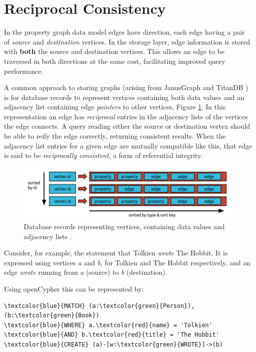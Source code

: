\documentclass[sigplan,10pt]{acmart}
\begin{document}
\section{Reciprocal Consistency}
\label{sec:recipr-cons}

In the property graph data model edges have direction, each edge having a pair of \emph{source} and \emph{destination} vertices. In the storage layer, edge information is stored with \textbf{both} the source and destination vertices. This allows an edge to be traversed in both directions at the same cost, facilitating improved query performance.

A common approach to storing graphs (arising from JanusGraph \cite{janusgraph} and TitanDB \cite{TitanDB}) is for database records to represent vertices containing both data values and an adjacency list containing edge \emph{pointers} to other vertices, Figure \ref{adj-list}. In this representation an edge has \emph{reciprocal} entries in the adjacency lists of the vertices the edge connects. A query reading either the source or destination vertex should be able to reify the edge correctly, returning consistent results. When the adjacency list entries for a given edge are mutually compatible like this, that edge is said to be \emph{reciprocally consistent}, a form of referential integrity.

\begin{figure}[ht]
  \centering
  \includegraphics[width=\linewidth]{./images/janusgraph-adj-list}
  \caption{Database records representing vertices, containing data values and adjacency lists \cite{janusgraph}.}
  \label{adj-list}
\end{figure}

Consider, for example, the statement that Tolkien \textit{wrote} The Hobbit. It is expressed using vertices \emph{a} and \emph{b}, for Tolkien and The Hobbit respectively, and an edge \textit{wrote} running from \emph{a} (source) to \emph{b} (destination).

Using openCypher \cite{openCypher} this can be represented by:
\begin{Verbatim}[commandchars=\\\{\},fontsize=\small,xleftmargin=.2in]
\textcolor{blue}{MATCH} (a:\textcolor{green}{Person}), (b:\textcolor{green}{Book})
\textcolor{blue}{WHERE} a.\textcolor{red}{name} = 'Tolkien' \textcolor{blue}{AND} b.\textcolor{red}{title} = 'The Hobbit'
\textcolor{blue}{CREATE} (a)-[w:\textcolor{green}{WROTE}]->(b)
\end{Verbatim}
\end{document}
